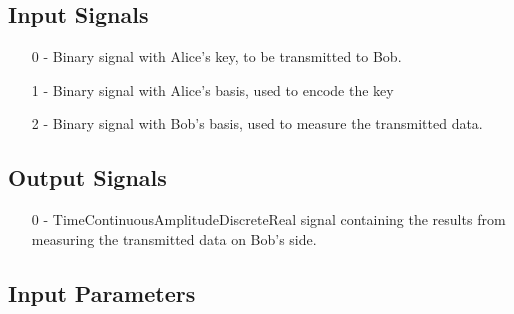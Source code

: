 \subsection*{Input Signals}

\begin{itemize}
	\item[0] - Binary signal with Alice's key, to be transmitted to Bob.
	\item[1] - Binary signal with Alice's basis, used to encode the key
	\item[2] - Binary signal with Bob's basis, used to measure the
	transmitted data.
\end{itemize}

\subsection*{Output Signals}

\begin{itemize}
	\item[0] - TimeContinuousAmplitudeDiscreteReal signal containing the
	results from measuring the transmitted data on Bob's side.
\end{itemize}


\subsection*{Input Parameters}

